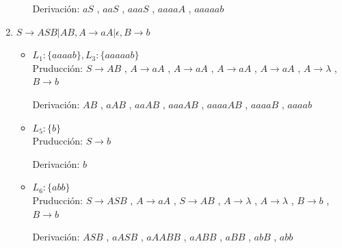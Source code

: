 \documentclass{article}
\begin{document}
\begin{enumerate}
\begin{itemize}
                        Derivación:
                        $ aS $ ,
                        $ aaS $ ,
                        $ aaaS $ ,
                        $ aaaaA $ ,
                        $ aaaaab $
                \end{itemize}
                
            \item $S \to ASB|AB, A \to aA| \epsilon, B \to b$
            
                \begin{itemize}
                    \item $ L_1 : \{aaaab\},  L_3 : \{aaaaab\}$ \\
                        Pruducción: 
                        $ S \to AB $ ,
                        $ A \to aA $ ,
                        $ A \to aA $ ,
                        $ A \to aA $ ,
                        $ A \to aA $ ,
                        $ A \to \lambda $ ,
                        $ B \to b $ 
                        
                        
                        Derivación:
                        $ AB $ ,
                        $ aAB $ ,
                        $ aaAB $ ,
                        $ aaaAB $ ,
                        $ aaaaAB $ ,
                        $ aaaaB $ ,
                        $ aaaab $ 
                
                    \item $ L_5 : \{b\}$ \\
                        Pruducción: 
                        $ S \to b $
                        
                        Derivación:
                        $ b $    
                        
                    \item $ L_6 : \{abb\}$ \\
                        Pruducción: 
                        $ S \to ASB $ ,
                        $ A \to aA $ ,
                        $ S \to AB $ ,
                        $ A \to \lambda $ ,
                        $ A \to \lambda $ ,
                        $ B \to b $ ,
                        $ B \to b $ 
                        
                        Derivación:
                        $ ASB $ ,
                        $ aASB $ ,
                        $ aAABB $ ,
                        $ aABB $ ,
                        $ aBB $ ,
                        $ abB $ ,
                        $ abb $ 
                        

\end{itemize}
\end{enumerate}
\end{document}
